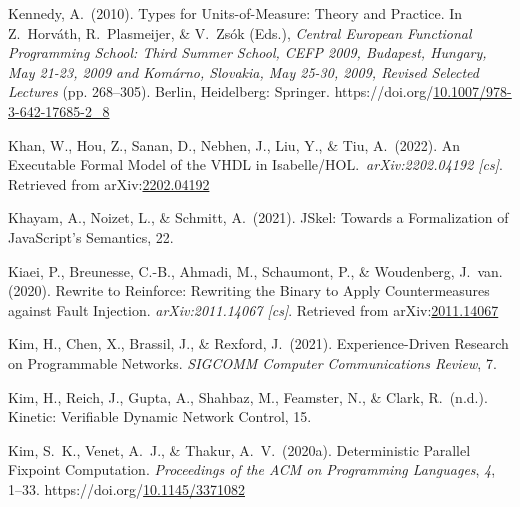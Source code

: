 \documentclass[12pt,twoside]{article}
\begin{document}
{\begin{thebibliography}{1079}
\mdbibitemlabel{}Kennedy, A.~(2010). Types for Units-of-Measure: Theory and Practice. In Z.~Horváth, R.~Plasmeijer, \& V.~Zsók (Eds.), \emph{Central European Functional Programming School: Third Summer School, CEFP 2009, Budapest, Hungary, May 21-23, 2009 and Komárno, Slovakia, May 25-30, 2009, Revised Selected Lectures} (pp. 268–305). Berlin, Heidelberg: Springer. https://doi.org/\href{https://dx.doi.org/10.1007/978-3-642-17685-2_8}{10.1007/978-3-642-17685-2\_8}%

\mdbibitemlabel{}Khan, W., Hou, Z., Sanan, D., Nebhen, J., Liu, Y., \& Tiu, A.~(2022). An Executable Formal Model of the VHDL in Isabelle/HOL.~\emph{arXiv:2202.04192 {}[cs]}. Retrieved from arXiv:\href{http://arxiv.org/abs/2202.04192}{2202.04192}%

\mdbibitemlabel{}Khayam, A., Noizet, L., \& Schmitt, A.~(2021). JSkel: Towards a Formalization of JavaScript’s Semantics, 22.%

\mdbibitemlabel{}Kiaei, P., Breunesse, C.-B., Ahmadi, M., Schaumont, P., \& Woudenberg, J.~van. (2020). Rewrite to Reinforce: Rewriting the Binary to Apply Countermeasures against Fault Injection. \emph{arXiv:2011.14067 {}[cs]}. Retrieved from arXiv:\href{http://arxiv.org/abs/2011.14067}{2011.14067}%

\mdbibitemlabel{}Kim, H., Chen, X., Brassil, J., \& Rexford, J.~(2021). Experience-Driven Research on Programmable Networks. \emph{SIGCOMM Computer Communications Review}, 7.%

\mdbibitemlabel{}Kim, H., Reich, J., Gupta, A., Shahbaz, M., Feamster, N., \& Clark, R.~(n.d.). Kinetic: Veriﬁable Dynamic Network Control, 15.%

\mdbibitemlabel{}Kim, S.~K., Venet, A.~J., \& Thakur, A.~V.~(2020a). Deterministic Parallel Fixpoint Computation. \emph{Proceedings of the ACM on Programming Languages}, \emph{4}, 1–33. https://doi.org/\href{https://dx.doi.org/10.1145/3371082}{10.1145/3371082}%


\end{thebibliography}}
\end{document}
